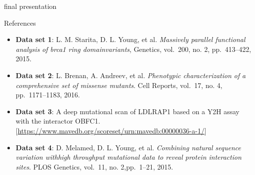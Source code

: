 \documentclass[ignorenonframetext,]{beamer}
\providecommand{\tightlist}{%
  \setlength{\itemsep}{0pt}\setlength{\parskip}{0pt}}
\begin{document}
\begin{frame}{final presentation}
\begin{block}{References}
\begin{itemize}
\tightlist
\item
  \textbf{Data set 1}: L. M. Starita, D. L. Young, et al.
  \emph{Massively parallel functional analysis of brca1 ring
  domainvariants}, Genetics, vol.~200, no. 2, pp.~413--422, 2015. 
\item
  \textbf{Data set 2}: L. Brenan, A. Andreev, et al. \emph{Phenotypic
  characterization of a comprehensive set of missense mutants}. Cell
  Reports, vol.~17, no. 4, pp.~1171--1183, 2016. 
\item
  \textbf{Data set 3}: A deep mutational scan of LDLRAP1 based on a Y2H
  assay with the interactor OBFC1.
  {[}\url{https://www.mavedb.org/scoreset/urn:mavedb:00000036-a-1/}{]} 
\item
  \textbf{Data set 4}: D. Melamed, D. L. Young, et al. \emph{Combining
  natural sequence variation withhigh throughput mutational data to
  reveal protein interaction sites}. PLOS Genetics, vol.~11, no.
  2,pp.~1--21, 2015. 
\end{itemize}

\end{block}

\end{frame}
\end{document}
